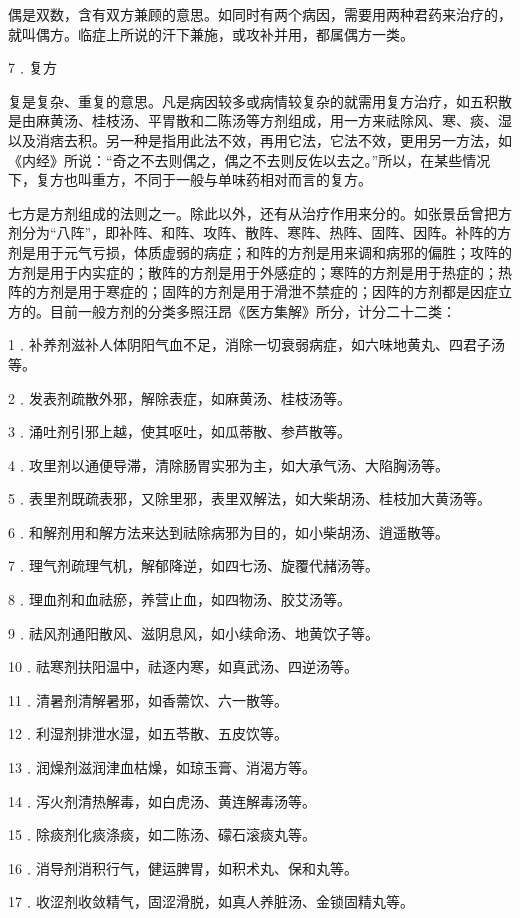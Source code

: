 \documentclass[12pt,UTF8]{ctexbook}
\begin{document}
偶是双数，含有双方兼顾的意思。如同时有两个病因，需要用两种君药来治疗的，就叫偶方。临症上所说的汗下兼施，或攻补并用，都属偶方一类。

7﹒复方

复是复杂、重复的意思。凡是病因较多或病情较复杂的就需用复方治疗，如五积散是由麻黄汤、桂枝汤、平胃散和二陈汤等方剂组成，用一方来祛除风、寒、痰、湿以及消痞去积。另一种是指用此法不效，再用它法，它法不效，更用另一方法，如《内经》所说：“奇之不去则偶之，偶之不去则反佐以去之。”所以，在某些情况下，复方也叫重方，不同于一般与单味药相对而言的复方。

七方是方剂组成的法则之一。除此以外，还有从治疗作用来分的。如张景岳曾把方剂分为“八阵”，即补阵、和阵、攻阵、散阵、寒阵、热阵、固阵、因阵。补阵的方剂是用于元气亏损，体质虚弱的病症；和阵的方剂是用来调和病邪的偏胜；攻阵的方剂是用于内实症的；散阵的方剂是用于外感症的；寒阵的方剂是用于热症的；热阵的方剂是用于寒症的；固阵的方剂是用于滑泄不禁症的；因阵的方剂都是因症立方的。目前一般方剂的分类多照汪昂《医方集解》所分，计分二十二类：

1﹒补养剂滋补人体阴阳气血不足，消除一切衰弱病症，如六味地黄丸、四君子汤等。

2﹒发表剂疏散外邪，解除表症，如麻黄汤、桂枝汤等。

3﹒涌吐剂引邪上越，使其呕吐，如瓜蒂散、参芦散等。

4﹒攻里剂以通便导滞，清除肠胃实邪为主，如大承气汤、大陷胸汤等。

5﹒表里剂既疏表邪，又除里邪，表里双解法，如大柴胡汤、桂枝加大黄汤等。

6﹒和解剂用和解方法来达到祛除病邪为目的，如小柴胡汤、逍遥散等。

7﹒理气剂疏理气机，解郁降逆，如四七汤、旋覆代赭汤等。

8﹒理血剂和血祛瘀，养营止血，如四物汤、胶艾汤等。

9﹒祛风剂通阳散风、滋阴息风，如小续命汤、地黄饮子等。

10﹒祛寒剂扶阳温中，祛逐内寒，如真武汤、四逆汤等。

11﹒清暑剂清解暑邪，如香薷饮、六一散等。

12﹒利湿剂排泄水湿，如五苓散、五皮饮等。

13﹒润燥剂滋润津血枯燥，如琼玉膏、消渴方等。

14﹒泻火剂清热解毒，如白虎汤、黄连解毒汤等。

15﹒除痰剂化痰涤痰，如二陈汤、礞石滚痰丸等。

16﹒消导剂消积行气，健运脾胃，如积术丸、保和丸等。

17﹒收涩剂收敛精气，固涩滑脱，如真人养脏汤、金锁固精丸等。
\end{document}
